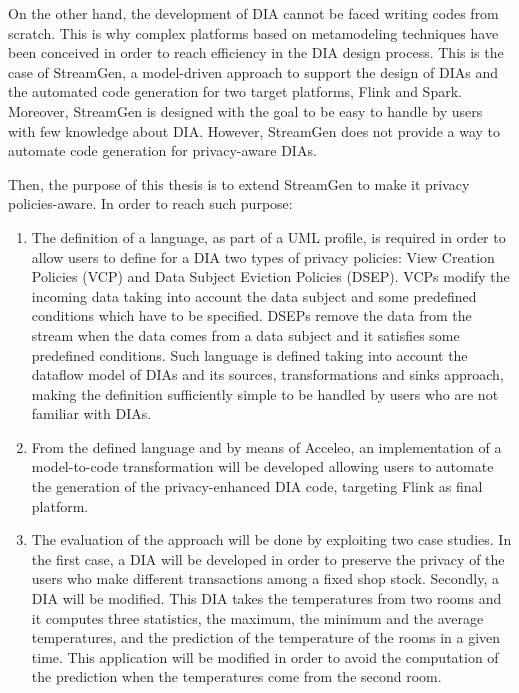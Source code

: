 On the other hand, the development of DIA cannot be faced writing codes from scratch. This is why complex platforms based on metamodeling techniques have been conceived in order to reach efficiency in the DIA design process. This is the case of StreamGen, a model-driven approach to support the design of DIAs and the automated code generation for two target platforms, Flink and Spark. Moreover, StreamGen is designed with the goal to be easy to handle by users with few knowledge about DIA. However, StreamGen does not provide a way to automate code generation for privacy-aware DIAs.

Then, the purpose of this thesis is to extend StreamGen to make it privacy policies-aware. In order to reach such purpose:

\begin{enumerate}
\item The definition of a language, as part of a UML profile, is required in order to allow users to define for a DIA two types of privacy policies: View Creation Policies (VCP) and Data Subject Eviction Policies (DSEP). VCPs modify the incoming data taking into account the data subject and some predefined conditions which have to be specified. DSEPs remove the data from the stream when the data comes from a data subject and it satisfies some predefined conditions. Such language is defined taking into account the dataflow model of DIAs and its sources, transformations and sinks approach, making the definition sufficiently simple to be handled by users who are not familiar with DIAs.
\item From the defined language and by means of Acceleo, an implementation of a model-to-code transformation will be developed allowing users to automate the generation of the privacy-enhanced DIA code, targeting Flink as final platform.
\item The evaluation of the approach will be done by exploiting two case studies. In the first case, a DIA will be developed in order to preserve the privacy of the users who make different transactions among a fixed shop stock. Secondly, a DIA will be modified. This DIA takes the temperatures from two rooms and it computes three statistics, the maximum, the minimum and the average temperatures, and the prediction of the temperature of the rooms in a given time. This application will be modified in order to avoid the computation of the prediction when the temperatures come from the second room.
\end{enumerate}


